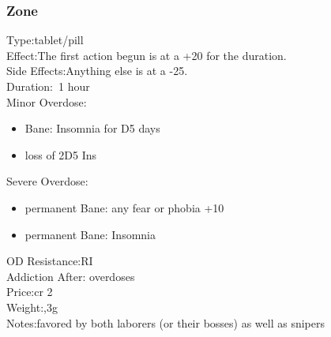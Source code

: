 \subsubsection{Zone}
Type:\tab tablet/pill\\
Effect:\tab The first action begun is at a +20 for the duration.\\
Side Effects:\tab Anything else is at a -25.\\
Duration:\tab ~1 hour\\
Minor Overdose:\\
\begin{itemize}
	\setlength\itemsep{-8mm}
	\vspace{-12mm}
	\item Bane: Insomnia for D5 days
	\item loss of 2D5 Ins
\end{itemize}
Severe Overdose:\\
\begin{itemize}
	\setlength\itemsep{-8mm}
	\vspace{-12mm}
	\item permanent Bane: any fear or phobia +10
	\item permanent Bane: Insomnia
\end{itemize}
OD Resistance:\tab RI\\
Addiction After: overdoses\\
Price:\tab cr 2\\
Weight:,3g\\
Notes:\tab favored by both laborers (or their bosses) as well as snipers

